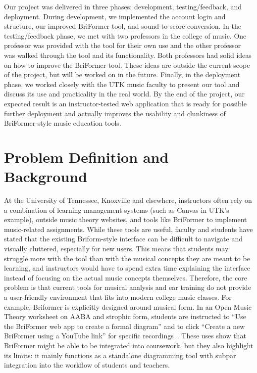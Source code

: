\documentclass[12pt, letterpaper]{article}
\begin{document}
Our project was delivered in three phases: development, testing/feedback, and deployment. During development, we implemented the account login and structure, our improved BriFormer tool, and sound-to-score conversion. In the testing/feedback phase, we met with two professors in the college of music. One professor was provided with the tool for their own use and the other professor was walked through the tool and its functionality. Both professors had solid ideas on how to improve the BriFormer tool. These ideas are outside the current scope of the project, but will be worked on in the future. Finally, in the deployment phase, we worked closely with the UTK music faculty to present our tool and discuss its use and practicality in the real world. By the end of the project, our expected result is an instructor-tested web application that is ready for possible further deployment and actually improves the usability and clunkiness of BriFormer-style music education tools.

\pagestyle{empty}

\tableofcontents
\listoftables
\listoffigures
\newpage

\pagestyle{plain}

\section*{Problem Definition and Background}
At the University of Tennessee, Knoxville and elsewhere, instructors often rely on a combination of learning management systems (such as Canvas in UTK's example), outside music theory websites, and tools like BriFormer to implement music-related assignments. While these tools are useful, faculty and students have stated that the existing Briform-style interface can be difficult to navigate and visually cluttered, especially for new users. This means that students may struggle more with the tool than with the musical concepts they are meant to be learning, and instructors would have to spend extra time explaining the interface instead of focusing on the actual music concepts themselves. Therefore, the core problem is that current tools for musical analysis and ear training do not provide a user-friendly environment that fits into modern college music classes. For example, Briformer is explicitly designed around musical form. In an Open Music Theory worksheet on AABA and strophic form, students are instructed to ``Use the BriFormer web app to create a formal diagram'' and to click ``Create a new BriFormer using a YouTube link'' for specific recordings~\cite{omt-aaba}. These uses show that BriFormer might be able to be integrated into coursework, but they also highlight its limits: it mainly functions as a standalone diagramming tool with subpar integration into the workflow of students and teachers.
\end{document}
